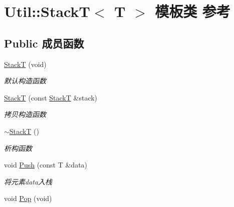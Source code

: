 \hypertarget{class_util_1_1_stack_t}{\section{Util\-:\-:Stack\-T$<$ T $>$ 模板类 参考}
\label{class_util_1_1_stack_t}
}
\subsection*{Public 成员函数}
\begin{DoxyCompactItemize}
\item 
\hypertarget{class_util_1_1_stack_t_adbbf65f8d1cf6764a5578de90e3ad551}{\hyperlink{class_util_1_1_stack_t_adbbf65f8d1cf6764a5578de90e3ad551}{Stack\-T} (void)}\label{class_util_1_1_stack_t_adbbf65f8d1cf6764a5578de90e3ad551}

\begin{DoxyCompactList}\small\item\em 默认构造函数 \end{DoxyCompactList}\item 
\hypertarget{class_util_1_1_stack_t_a5731dcd6ca4aa9b0b6ef57c61633cf7e}{\hyperlink{class_util_1_1_stack_t_a5731dcd6ca4aa9b0b6ef57c61633cf7e}{Stack\-T} (const \hyperlink{class_util_1_1_stack_t}{Stack\-T} \&stack)}\label{class_util_1_1_stack_t_a5731dcd6ca4aa9b0b6ef57c61633cf7e}

\begin{DoxyCompactList}\small\item\em 拷贝构造函数 \end{DoxyCompactList}\item 
\hypertarget{class_util_1_1_stack_t_a1e3f88666426b8ddfbc6e76615f00dd4}{\hyperlink{class_util_1_1_stack_t_a1e3f88666426b8ddfbc6e76615f00dd4}{$\sim$\-Stack\-T} ()}\label{class_util_1_1_stack_t_a1e3f88666426b8ddfbc6e76615f00dd4}

\begin{DoxyCompactList}\small\item\em 析构函数 \end{DoxyCompactList}\item 
void \hyperlink{class_util_1_1_stack_t_af12278ddc72374d7d134828c6590ea7f}{Push} (const T \&data)
\begin{DoxyCompactList}\small\item\em 将元素data入栈 \end{DoxyCompactList}\item 
\hypertarget{class_util_1_1_stack_t_af3ee55adee3de52f9e88f8d0edd8dd71}{void \hyperlink{class_util_1_1_stack_t_af3ee55adee3de52f9e88f8d0edd8dd71}{Pop} (void)}\label{class_util_1_1_stack_t_af3ee55adee3de52f9e88f8d0edd8dd71}


\end{DoxyCompactItemize}
